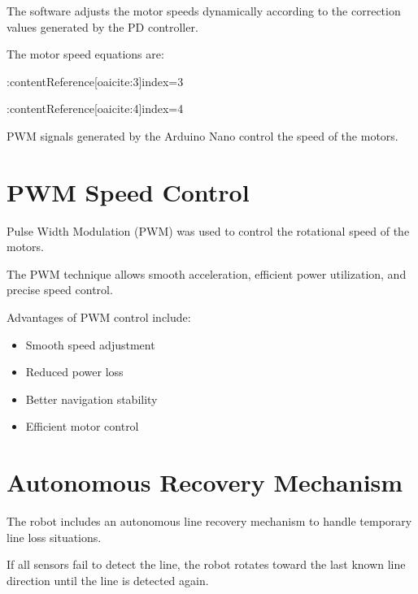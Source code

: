 \documentclass[12pt,a4paper,oneside]{report}
\begin{document}
The software adjusts the motor speeds dynamically according to the correction values generated by the PD controller.

The motor speed equations are:

:contentReference[oaicite:3]{index=3}

:contentReference[oaicite:4]{index=4}

PWM signals generated by the Arduino Nano control the speed of the motors.


\section{PWM Speed Control}

Pulse Width Modulation (PWM) was used to control the rotational speed of the motors.

The PWM technique allows smooth acceleration, efficient power utilization, and precise speed control.

Advantages of PWM control include:

\begin{itemize}

\item Smooth speed adjustment

\item Reduced power loss

\item Better navigation stability

\item Efficient motor control

\end{itemize}


\section{Autonomous Recovery Mechanism}

The robot includes an autonomous line recovery mechanism to handle temporary line loss situations.

If all sensors fail to detect the line, the robot rotates toward the last known line direction until the line is detected again.
\end{document}
